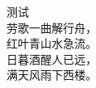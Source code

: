 \documentclass{ctexart}
\begin{document}
测试\\
劳歌一曲解行舟，\\
红叶青山水急流。\\
日暮酒醒人已远，\\
满天风雨下西楼。
\end{document}
